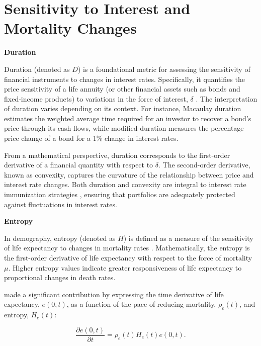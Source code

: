 \documentclass[12pt]{article}
\begin{document}
\section{Sensitivity to Interest and Mortality Changes}\label{sec:SensitivityMortalityInterest}

\textbf{Duration}

Duration (denoted as $D$) is a foundational metric for assessing the sensitivity of financial instruments to changes in interest rates. Specifically, it quantifies the price sensitivity of a life annuity (or other financial assets such as bonds and fixed-income products) to variations in the force of interest, $\delta$ \citep{milevsky2013life,charupat2016sluggish}. The interpretation of duration varies depending on its context. For instance, Macaulay duration estimates the weighted average time required for an investor to recover a bond's price through its cash flows, while modified duration measures the percentage price change of a bond for a 1\% change in interest rates.

From a mathematical perspective, duration corresponds to the first-order derivative of a financial quantity with respect to $\delta$. The second-order derivative, known as convexity, captures the curvature of the relationship between price and interest rate changes. Both duration and convexity are integral to interest rate immunization strategies \citep{redington1951papers,fisher1971coping,shiu1990redington,santomero1997financial,courtois2007immunization}, ensuring that portfolios are adequately protected against fluctuations in interest rates.

\textbf{Entropy}

In demography, entropy (denoted as $H$) is defined as a measure of the sensitivity of life expectancy to changes in mortality rates \citep{leser1955variations,keyfitz1977difference,demetrius1974demographic,goldman1986new, aburto2019threshold}. Mathematically, the entropy is the first-order derivative of life expectancy with respect to the force of mortality $\mu$. Higher entropy values indicate greater responsiveness of life expectancy to proportional changes in death rates.

\citet{Vaupel2003} made a significant contribution by expressing the time derivative of life expectancy, $e(0, t)$, as a function of the pace of reducing mortality, $\rho_e(t)$, and entropy, $H_e(t)$:

\begin{equation}\label{eq:lifeexpdecomp}
	\dfrac{\partial e(0,t)}{\partial t} = \rho_e(t) H_e(t) e(0,t).
\end{equation}
\end{document}
